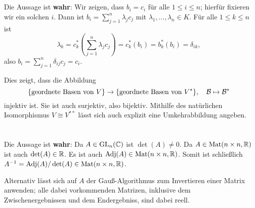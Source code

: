 \documentclass[a4paper,10pt]{article}
\begin{document}
\section{}
Die Aussage ist \textbf{wahr}: Wir zeigen, dass $b_i = c_i$ für alle $1 \leq i \leq n$; hierfür fixieren wir ein solchen $i$. Dann ist $b_i = \sum_{j=1}^n \lambda_j c_j$ mit $\lambda_1, \dotsc, \lambda_n \in K$. Für alle $1 \leq k \leq n$ ist
\[
 \lambda_k
 = c_k^*\left( \sum_{j=1}^n \lambda_j c_j \right)
 = c_k^*(b_i)
 = b_k^*(b_i)
 = \delta_{ik},
\]
also $b_i = \sum_{j=1}^n \delta_{ij} c_j = c_i$.

\begin{bem}
Dies zeigt, dass die Abbildung
\[
 \{\text{geordnete Basen von $V$}\} \to \{\text{geordnete Basen von $V^*$}\}, \quad \mathcal{B} \mapsto \mathcal{B}^*
\]
injektiv ist. Sie ist auch surjektiv, also bijektiv. Mithilfe des natürlichen Isomorphismus $V \cong V^{**}$ lässt sich auch explizit eine Umkehrabbildung angeben.
\end{bem}





\section{}
Die Aussage ist \textbf{wahr}: Da $A \in \mathrm{GL}_n(\mathbb{C})$ ist $\det(A) \neq 0$. Da $A \in \mathrm{Mat}(n \times n, \mathbb{R})$ ist auch $\det(A) \in \mathbb{R}$. Es ist auch $\operatorname{Adj}(A) \in \mathrm{Mat}(n \times n, \mathbb{R})$. Somit ist schließlich $A^{-1} = \operatorname{Adj}(A)/\det(A) \in \mathrm{Mat}(n \times n, \mathbb{R})$.

Alternativ lässt sich auf $A$ der Gauß-Algorithmus zum Invertieren einer Matrix anwenden; alle dabei vorkommenden Matrizen, inklusive dem Zwischenergebnissen und dem Endergebniss, sind dabei reell.
\end{document}

